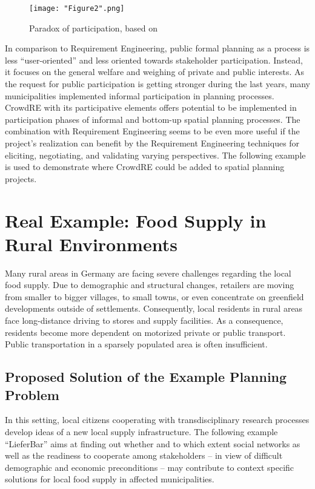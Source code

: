 \documentclass[conference]{IEEEtran}
\begin{document}
\begin{figure}[htbp]
	\centering
	\texttt{[image: "Figure2".png]}\hfill
	\caption{Paradox of participation, based on \cite{Reinert.1997}}
	\label{figure:2}
\end{figure}

In comparison to Requirement Engineering, public formal planning as a process 
is less ``user-oriented'' and less oriented towards stakeholder participation. 
Instead, it focuses on the general welfare and weighing of private and public 
interests. As the request for public participation is getting stronger during 
the last years, many municipalities implemented informal participation in 
planning processes. CrowdRE with its participative elements offers potential to 
be implemented in participation phases of informal and bottom-up spatial 
planning processes. The combination with Requirement Engineering seems to be 
even more useful if the project's realization can benefit by the Requirement 
Engineering techniques for eliciting, negotiating, and validating varying 
perspectives. 
The following example is used to demonstrate where CrowdRE could be added to 
spatial planning projects.

\section{Real Example: Food Supply in Rural Environments}
\label{ch:3}
Many rural areas in Germany are facing severe challenges regarding the local 
food supply. Due to demographic and structural changes, retailers are moving 
from smaller to bigger villages, to small towns, or even concentrate on 
greenfield developments outside of settlements. Consequently, local residents 
in rural areas face long-distance driving to stores and supply facilities. As a 
consequence, residents become more dependent on motorized private or public 
transport. Public transportation in a sparsely populated area is often 
insufficient.

\subsection{Proposed Solution of the Example Planning Problem}
In this setting, local citizens cooperating with transdisciplinary research 
processes develop ideas of a new local supply infrastructure. The following 
example ``LieferBar'' \cite{Jagenteufel.2013} aims at finding out whether and 
to which extent social networks as well as the readiness to cooperate among 
stakeholders – in view of difficult demographic and economic preconditions – 
may contribute to context specific solutions for local food supply in affected 
municipalities.
\end{document}

